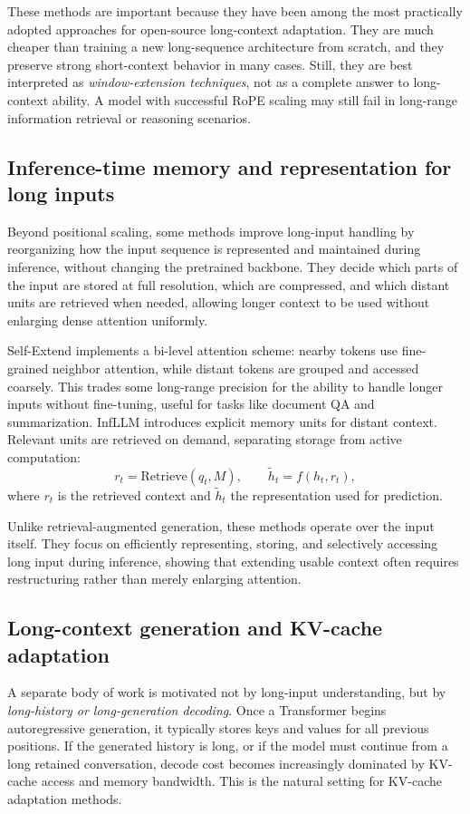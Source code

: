 \documentclass{article}
\begin{document}
These methods are important because they have been among the most practically adopted approaches for open-source long-context adaptation. They are much cheaper than training a new long-sequence architecture from scratch, and they preserve strong short-context behavior in many cases. Still, they are best interpreted as \emph{window-extension techniques}, not as a complete answer to long-context ability. A model with successful RoPE scaling may still fail in long-range information retrieval or reasoning scenarios.

\subsection{Inference-time memory and representation for long inputs}
Beyond positional scaling, some methods improve long-input handling by reorganizing how the input sequence is represented and maintained during inference, without changing the pretrained backbone. They decide which parts of the input are stored at full resolution, which are compressed, and which distant units are retrieved when needed, allowing longer context to be used without enlarging dense attention uniformly.

Self-Extend \citep{jin2024selfextend} implements a bi-level attention scheme: nearby tokens use fine-grained neighbor attention, while distant tokens are grouped and accessed coarsely. This trades some long-range precision for the ability to handle longer inputs without fine-tuning, useful for tasks like document QA and summarization. InfLLM \citep{xiao2024infllm} introduces explicit memory units for distant context. Relevant units are retrieved on demand, separating storage from active computation:
\begin{equation}
r_t = \mathrm{Retrieve}(q_t, M), \qquad
\tilde{h}_t = f(h_t, r_t),
\end{equation}
where $r_t$ is the retrieved context and $\tilde{h}_t$ the representation used for prediction.

Unlike retrieval-augmented generation, these methods operate over the input itself. They focus on efficiently representing, storing, and selectively accessing long input during inference, showing that extending usable context often requires restructuring rather than merely enlarging attention.

\subsection{Long-context generation and KV-cache adaptation}
A separate body of work is motivated not by long-input understanding, but by \emph{long-history or long-generation decoding}. Once a Transformer begins autoregressive generation, it typically stores keys and values for all previous positions. If the generated history is long, or if the model must continue from a long retained conversation, decode cost becomes increasingly dominated by KV-cache access and memory bandwidth. This is the natural setting for KV-cache adaptation methods.
\end{document}
